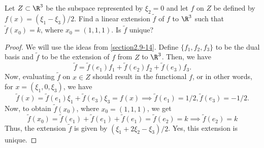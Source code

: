 \begin{question}
    Let $Z \subset \R^3$ be the subspace represented by $\xi_2 = 0$ and let $f$ on $Z$ be defined by $f(x) = (\xi_1 - \xi_3)/2$. Find a linear extension $\tilde{f}$ of $f$ to $\R^3$ such that $\tilde{f}(x_0) = k$, where $x_0 = (1,1,1)$. Is $\tilde{f}$ unique?
    \label{section2.9-15}
\end{question}
\begin{proof}
    We will use the ideas from \ref{section2.9-14}. Define $\{f_1 , f_2 , f_3\}$ to be the dual basis and $\tilde{f}$ to be the extension of $f$ from $Z$ to $\R^3$. Then, we have
    \[\tilde{f} = \tilde{f}(e_1)f_1 + \tilde{f}(e_2)f_2 + \tilde{f}(e_3)f_3.\]
    Now, evaluating $\tilde{f}$ on $x \in Z$ should result in the functional $f$, or in other words, for $x = (\xi_1 , 0 , \xi_3)$, we have
    \[\tilde{f}(x) = \tilde{f}(e_1)\xi_1 +  \tilde{f}(e_3)\xi_3 = f(x) \implies \tilde{f}(e_1) = 1/2 , \tilde{f}(e_3) = -1/2.\]
    Now, to obtain $\tilde{f}(x_0)$, where $x_0 = (1,1,1)$, we get
    \[\tilde{f}(x_0) = \tilde{f}(e_1) + \tilde{f}(e_1) + \tilde{f}(e_1) = \tilde{f}(e_2) = k \implies \tilde{f}(e_2) = k\]
    Thus, the extension $\tilde{f}$ is given by $(\xi_1 + 2\xi_2 - \xi_3)/2$. Yes, this extension is unique.
\end{proof}